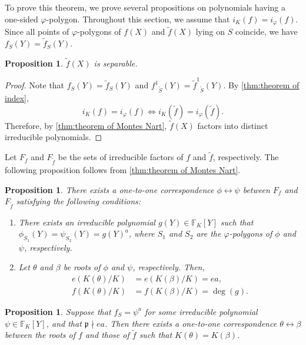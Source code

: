 \documentclass{article}
\newcommand{\field}[1]{\mathbb{#1}}
\newtheorem{proposition}[theorem]{Proposition}
\theoremstyle{definition}
\theoremstyle{remark}
\numberwithin{equation}{section}
\begin{document}
  To prove this theorem, we prove several propositions on polynomials having a one-sided $\varphi$-polygon. 
  Throughout this section, we assume that $i_K(f) = i_{\varphi}(f)$. 
  Since all points of $\varphi$-polygons of $f(X)$ and $\tilde{f}(X)$ lying on $S$ coincide, 
  we have $f_S(Y) = \tilde{f}_S(Y)$. 

  \begin{proposition}\label{prop:claim 2}
    $\tilde{f}(X)$ is separable. 
  \end{proposition}

  \begin{proof}
    Note that $f_S(Y) = \tilde{f}_S(Y)$ and ${f^1}_{\tilde{S}}(Y) = {\tilde{f}^1}_{\tilde{S}}(Y)$. 
    By \cref{thm:theorem of index}, 
    \[
      i_K(f) = i_{\varphi}(f) \Leftrightarrow i_K(\tilde{f}) = i_{\varphi}(\tilde{f}). 
    \]
    Therefore, by \cref{thm:theorem of Montes Nart}, $\tilde{f}(X)$ factors into distinct irreducible polynomials. 
  \end{proof}

  Let $F_f$ and $F_{\tilde{f}}$ be the sets of irreducible factors of $f$ and $\tilde{f}$, respectively. 
  The following proposition follows from \cref{thm:theorem of Montes Nart}. 

  \begin{proposition}\label{prop:claim 3}
    There exists a one-to-one correspondence $\phi \leftrightarrow \psi$ between $F_f$ and $F_{\tilde{f}}$ satisfying the following conditions: 
    \begin{enumerate}
      \item There exists an irreducible polynomial $g(Y) \in \field{F}_K[Y]$ such that $\phi_{S_1}(Y) = \psi_{S_2}(Y) = g(Y)^a$, where $S_1$ and $S_2$ are the $\varphi$-polygons of $\phi$ and $\psi$, respectively. 
      \item Let $\theta$ and $\beta$ be roots of $\phi$ and $\psi$, respectively. Then, 
      \begin{align}
        e(K(\theta)/K) &= e(K(\beta)/K) = ea, \\
        f(K(\theta)/K) &= f(K(\beta)/K) = \deg(g). 
      \end{align}
    \end{enumerate}
  \end{proposition}

  \begin{proposition}\label{prop:claim 4}
    Suppose that $f_S = \psi^a$ for some irreducible polynomial $\psi \in \field{F}_K[Y]$, and 
    that $\mathfrak{p} \nmid ea$. 
    Then there exists a one-to-one correspondence $\theta \leftrightarrow \beta$ between the roots of $f$ and those of $\tilde{f}$ such that $K(\theta) = K(\beta)$. 
  \end{proposition}
\end{document}
